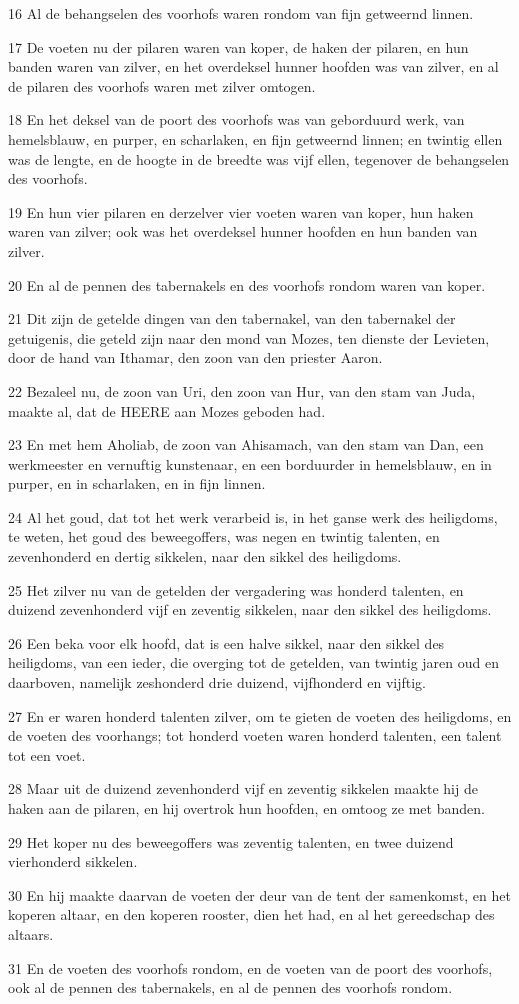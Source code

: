 \par 16 Al de behangselen des voorhofs waren rondom van fijn getweernd linnen.
\par 17 De voeten nu der pilaren waren van koper, de haken der pilaren, en hun banden waren van zilver, en het overdeksel hunner hoofden was van zilver, en al de pilaren des voorhofs waren met zilver omtogen.
\par 18 En het deksel van de poort des voorhofs was van geborduurd werk, van hemelsblauw, en purper, en scharlaken, en fijn getweernd linnen; en twintig ellen was de lengte, en de hoogte in de breedte was vijf ellen, tegenover de behangselen des voorhofs.
\par 19 En hun vier pilaren en derzelver vier voeten waren van koper, hun haken waren van zilver; ook was het overdeksel hunner hoofden en hun banden van zilver.
\par 20 En al de pennen des tabernakels en des voorhofs rondom waren van koper.
\par 21 Dit zijn de getelde dingen van den tabernakel, van den tabernakel der getuigenis, die geteld zijn naar den mond van Mozes, ten dienste der Levieten, door de hand van Ithamar, den zoon van den priester Aaron.
\par 22 Bezaleel nu, de zoon van Uri, den zoon van Hur, van den stam van Juda, maakte al, dat de HEERE aan Mozes geboden had.
\par 23 En met hem Aholiab, de zoon van Ahisamach, van den stam van Dan, een werkmeester en vernuftig kunstenaar, en een borduurder in hemelsblauw, en in purper, en in scharlaken, en in fijn linnen.
\par 24 Al het goud, dat tot het werk verarbeid is, in het ganse werk des heiligdoms, te weten, het goud des beweegoffers, was negen en twintig talenten, en zevenhonderd en dertig sikkelen, naar den sikkel des heiligdoms.
\par 25 Het zilver nu van de getelden der vergadering was honderd talenten, en duizend zevenhonderd vijf en zeventig sikkelen, naar den sikkel des heiligdoms.
\par 26 Een beka voor elk hoofd, dat is een halve sikkel, naar den sikkel des heiligdoms, van een ieder, die overging tot de getelden, van twintig jaren oud en daarboven, namelijk zeshonderd drie duizend, vijfhonderd en vijftig.
\par 27 En er waren honderd talenten zilver, om te gieten de voeten des heiligdoms, en de voeten des voorhangs; tot honderd voeten waren honderd talenten, een talent tot een voet.
\par 28 Maar uit de duizend zevenhonderd vijf en zeventig sikkelen maakte hij de haken aan de pilaren, en hij overtrok hun hoofden, en omtoog ze met banden.
\par 29 Het koper nu des beweegoffers was zeventig talenten, en twee duizend vierhonderd sikkelen.
\par 30 En hij maakte daarvan de voeten der deur van de tent der samenkomst, en het koperen altaar, en den koperen rooster, dien het had, en al het gereedschap des altaars.
\par 31 En de voeten des voorhofs rondom, en de voeten van de poort des voorhofs, ook al de pennen des tabernakels, en al de pennen des voorhofs rondom.

